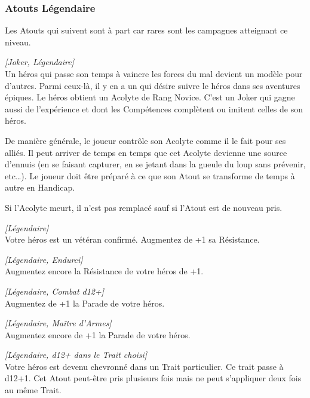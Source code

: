 \newpage
\subsubsection{Atouts Légendaire}

Les Atouts qui suivent sont à part car rares sont les campagnes atteignant ce niveau.

\begin{description}[align=left]
    \item [Acolyte]
        \emph{[Joker, Légendaire]}\\
        Un héros qui passe son temps à vaincre les forces du mal devient un modèle pour d’autres. Parmi ceux-là, il y en a un qui désire suivre le héros dans ses aventures épiques. Le héros obtient un Acolyte de Rang Novice. C’est un Joker qui gagne aussi de l’expérience et dont les Compétences complètent ou imitent celles de son héros.

        De manière générale, le joueur contrôle son Acolyte comme il le fait pour ses alliés. Il peut arriver de temps en temps que cet Acolyte devienne une source d’ennuis (en se faisant capturer, en se jetant dans la gueule du loup sans prévenir, etc\ldots). Le joueur doit être préparé à ce que son Atout se transforme de temps à autre en Handicap.

        Si l’Acolyte meurt, il n’est pas remplacé sauf si l’Atout est de nouveau pris.

    \item [Endurci]
        \emph{[Légendaire]}\\
        Votre héros est un vétéran confirmé. Augmentez de +1 sa Résistance.

    \item [Coriace]
        \emph{[Légendaire, Endurci]}\\
        Augmentez encore la Résistance de votre héros de +1.

    \item [Maître d’Armes]
        \emph{[Légendaire, Combat d12+]}\\
        Augmentez de +1 la Parade de votre héros.

    \item [Maître d’Armes Légendaire]
        \emph{[Légendaire, Maître d’Armes]}\\
        Augmentez encore de +1 la Parade de votre héros.

    \item [Professionnel]
        \label{sec:atout-professionnel}
        \emph{[Légendaire, d12+ dans le Trait choisi]}\\
        Votre héros est devenu chevronné dans un Trait particulier. Ce trait passe à d12+1. Cet Atout peut-être pris plusieurs fois mais ne peut s’appliquer deux fois au même Trait.


\end{description}
